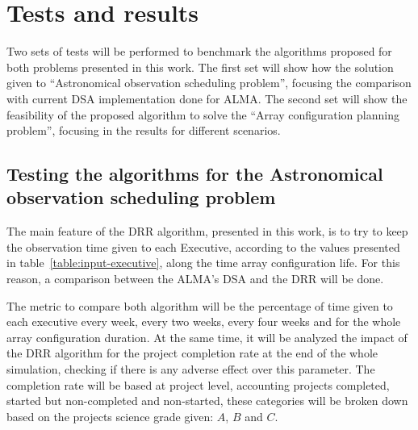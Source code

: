 \chapter{Tests and results}

Two sets of tests will be performed to benchmark the algorithms proposed for both problems presented in this work.
The first set will show how the solution given to ``Astronomical observation scheduling problem'', focusing the comparison with current DSA implementation done for ALMA.
The second set will show the feasibility of the proposed algorithm to solve the ``Array configuration planning problem'', focusing in the results for different scenarios.

\section{Testing the algorithms for the Astronomical observation scheduling problem}

The main feature of the DRR algorithm, presented in this work, is to try to keep the observation time given to each Executive, according to the values presented in table~\ref{table:input-executive}, along the time array configuration life. For this reason, a comparison between the ALMA's DSA and the DRR will be done. 

The metric to compare both algorithm will be the percentage of time given to each executive every week, every two weeks, every four weeks and for the whole array configuration duration. At the same time, it will be analyzed the impact of the DRR algorithm for the project completion rate at the end of the whole simulation, checking if there is any adverse effect over this parameter. The completion rate will be based at project level, accounting projects completed, started but non-completed and non-started, these categories will be broken down based on the projects science grade given: $A$, $B$ and $C$.

